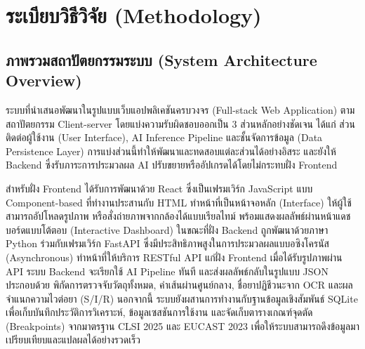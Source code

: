 ﻿%
\chapter{ระเบียบวิธีวิจัย (Methodology)}

\section{ภาพรวมสถาปัตยกรรมระบบ (System Architecture Overview)}

ระบบที่นำเสนอพัฒนาในรูปแบบเว็บแอปพลิเคชันครบวงจร (Full-stack Web Application) ตามสถาปัตยกรรม Client-server โดยแบ่งความรับผิดชอบออกเป็น 3 ส่วนหลักอย่างชัดเจน ได้แก่ ส่วนติดต่อผู้ใช้งาน (User Interface), AI Inference Pipeline และชั้นจัดการข้อมูล (Data Persistence Layer) การแบ่งส่วนนี้ทำให้พัฒนาและทดสอบแต่ละส่วนได้อย่างอิสระ และยังให้ Backend ซึ่งรับภาระการประมวลผล AI ปรับขยายหรืออัปเกรดได้โดยไม่กระทบฝั่ง Frontend

สำหรับฝั่ง Frontend ได้รับการพัฒนาด้วย React ซึ่งเป็นเฟรมเวิร์ก JavaScript แบบ Component-based ที่ทำงานประสานกับ HTML \cite{sharma2018html,mozilla2025html} ทำหน้าที่เป็นหน้าจอหลัก (Interface) ให้ผู้ใช้สามารถอัปโหลดรูปภาพ หรือสั่งถ่ายภาพจากกล้องได้แบบเรียลไทม์ พร้อมแสดงผลลัพธ์ผ่านหน้าแดชบอร์ดแบบโต้ตอบ (Interactive Dashboard) ในขณะที่ฝั่ง Backend ถูกพัฒนาด้วยภาษา Python \cite{siva2023python} ร่วมกับเฟรมเวิร์ก FastAPI \cite{tioman2024fastapi} ซึ่งมีประสิทธิภาพสูงในการประมวลผลแบบอซิงโครนัส (Asynchronous) ทำหน้าที่ให้บริการ RESTful API แก่ฝั่ง Frontend 
เมื่อได้รับรูปภาพผ่าน API ระบบ Backend จะเรียกใช้ AI Pipeline ทันที และส่งผลลัพธ์กลับในรูปแบบ JSON ประกอบด้วย พิกัดการตรวจจับวัตถุทั้งหมด, ค่าเส้นผ่านศูนย์กลาง, ชื่อยาปฏิชีวนะจาก OCR และผลจำแนกความไวต่อยา (S/I/R) นอกจากนี้ ระบบยังผสานการทำงานกับฐานข้อมูลเชิงสัมพันธ์ SQLite \cite{sqlite} เพื่อเก็บบันทึกประวัติการวิเคราะห์, ข้อมูลเซสชันการใช้งาน และจัดเก็บตารางเกณฑ์จุดตัด (Breakpoints) จากมาตรฐาน CLSI 2025 และ EUCAST 2023 เพื่อให้ระบบสามารถดึงข้อมูลมาเปรียบเทียบและแปลผลได้อย่างรวดเร็ว

